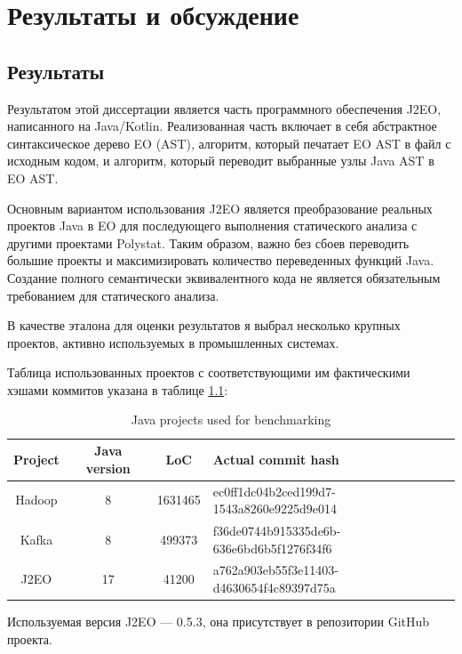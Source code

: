 \documentclass[oneside,final,14pt,a4paper]{extreport}
\theoremstyle{definition}
\theoremstyle{remark}
\theoremstyle{remark}
\begin{document}
\chapter{Результаты и обсуждение}
\label{chapter:results_and_discussion}

\section{Результаты}

Результатом этой диссертации является часть программного обеспечения J2EO, написанного на Java/Kotlin. Реализованная часть включает в себя абстрактное синтаксическое дерево EO (AST), алгоритм, который печатает EO AST в файл с исходным кодом, и алгоритм, который переводит выбранные узлы Java AST в EO AST.

Основным вариантом использования J2EO является преобразование реальных проектов Java в EO для последующего выполнения статического анализа с другими проектами Polystat. Таким образом, важно без сбоев переводить большие проекты и максимизировать количество переведенных функций Java. Создание полного семантически эквивалентного кода не является обязательным требованием для статического анализа.

В качестве эталона для оценки результатов я выбрал несколько крупных проектов, активно используемых в промышленных системах.

Таблица использованных проектов с соответствующими им фактическими хэшами коммитов указана в таблице \ref{table:benchmark_projects}:

\begin{table}[H]
  \centering
  \begin{tabular}{| c | c | c | p{5cm} |} 
      \hline
      Project & Java version & LoC & Actual commit hash \\
      \hline
      Hadoop \cite{hadoop_repo} & 8 & 1631465 &   ec0ff1dc04b2ced199d7- 1543a8260e9225d9e014 \\
      \hline
      Kafka \cite{kafka_repo} & 8 & 499373 & f36de0744b915335de6b- 636e6bd6b5f1276f34f6 \\
      \hline
      J2EO \cite{j2eo_repo} & 17 & 41200 & a762a903eb55f3e11403-d4630654f4c89397d75a \\
      \hline
  \end{tabular}
  \caption{Java projects used for benchmarking}
  \label{table:benchmark_projects}
\end{table}

Используемая версия J2EO — 0.5.3, она присутствует в репозитории GitHub \cite{j2eo_repo} проекта.
\end{document}
